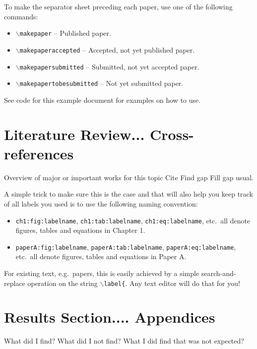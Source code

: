To make the separator sheet preceding each paper, use one of the following commands:
\begin{itemize}
	\item \texttt{$\backslash$makepaper} -- Published paper.
	\item \texttt{$\backslash$makepaperaccepted} -- Accepted, not yet published paper.
	\item \texttt{$\backslash$makepapersubmitted} -- Submitted, not yet accepted paper.
	\item \texttt{$\backslash$makepapertobesubmitted} -- Not yet submitted paper.
\end{itemize}

See code for this example document for examples on how to use.

\section{Literature Review... Cross-references}
Overview of major or important works for this topic
Cite
Find gap
Fill gap
usual.

A simple trick to make sure this is the case and that will also help you keep track of all labels you used is to use the following naming convention:
\begin{itemize}
	\item \texttt{ch1:fig:labelname}, \texttt{ch1:tab:labelname}, \texttt{ch1:eq:labelname}, etc.\ all denote figures, tables and equations in Chapter 1.
	\item \texttt{paperA:fig:labelname}, \texttt{paperA:tab:labelname}, \texttt{paperA:eq:labelname}, etc.\ all denote figures, tables and equations in Paper A.
\end{itemize}

For existing text, e.g.\ papers, this is easily achieved by a simple search-and-replace operation on the string \texttt{$\backslash$label\{}. Any text editor will do that for you!

\section{Results Section.... Appendices\label{sec:app}}
What did I find?
What did I not find?
What I did find that was not expected?

